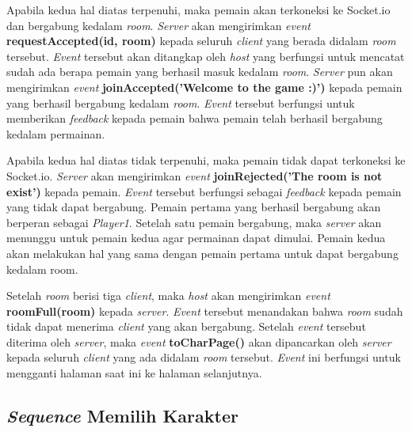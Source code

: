 Apabila kedua hal diatas terpenuhi, maka pemain akan terkoneksi ke Socket.io dan bergabung kedalam \textit{room}. \textit{Server} akan mengirimkan \textit{event} \textbf{requestAccepted(id, room)} kepada seluruh \textit{client} yang berada didalam \textit{room} tersebut. \textit{Event} tersebut akan ditangkap oleh \textit{host} yang berfungsi untuk mencatat sudah ada berapa pemain yang berhasil masuk kedalam \textit{room}. \textit{Server} pun akan mengirimkan \textit{event} \textbf{joinAccepted('Welcome to the game :)')} kepada pemain yang berhasil bergabung kedalam \textit{room}. \textit{Event} tersebut berfungsi untuk memberikan \textit{feedback} kepada pemain bahwa pemain telah berhasil bergabung kedalam permainan.

Apabila kedua hal diatas tidak terpenuhi, maka pemain tidak dapat terkoneksi ke Socket.io. \textit{Server} akan mengirimkan \textit{event} \textbf{joinRejected('The room is not exist')} kepada pemain. \textit{Event} tersebut berfungsi sebagai \textit{feedback} kepada pemain yang tidak dapat bergabung. Pemain pertama yang berhasil bergabung akan berperan sebagai \textit{Player1}. Setelah satu pemain bergabung, maka \textit{server} akan menunggu untuk pemain kedua agar permainan dapat dimulai. Pemain kedua akan melakukan hal yang sama dengan pemain pertama untuk dapat bergabung kedalam room.

Setelah \textit{room} berisi tiga \textit{client}, maka \textit{host} akan mengirimkan \textit{event} \textbf{roomFull(room)} kepada \textit{server}. \textit{Event} tersebut menandakan bahwa \textit{room} sudah tidak dapat menerima \textit{client} yang akan bergabung. Setelah \textit{event} tersebut diterima oleh \textit{server}, maka \textit{event} \textbf{toCharPage()} akan dipancarkan oleh \textit{server} kepada seluruh \textit{client} yang ada didalam \textit{room} tersebut. \textit{Event} ini berfungsi untuk mengganti halaman saat ini ke halaman selanjutnya.

\subsection{\textit{Sequence} Memilih Karakter}

